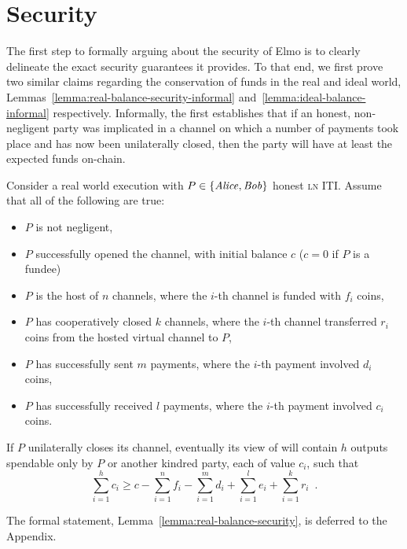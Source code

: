 \section{Security}
  \label{section:security}
  The first step to formally arguing about the security of Elmo is to
  clearly delineate the exact security guarantees it provides. To that end, we
  first prove two similar claims regarding the conservation of funds in the real
  and ideal world, Lemmas~\ref{lemma:real-balance-security-informal}
  and~\ref{lemma:ideal-balance-informal} respectively. Informally, the first
  establishes that if an honest, non-negligent party was implicated in a channel
  on which a number of payments took place and has now been unilaterally closed,
  then the party will have at least the expected funds on-chain.

\begin{lemma}
\label{lemma:real-balance-security-informal}
  Consider a real world execution with $P \in \{\mathit{Alice}, \mathit{Bob}\}$ honest
  \textsc{ln} ITI. Assume that all of the following are true:
  \begin{itemize}
    \item $P$ is not negligent,
    \item $P$ successfully opened the channel, with initial balance $c$ ($c = 0$
    if $P$ is a fundee)
    \item $P$ is the host of $n$ channels, where the $i$-th channel is funded
    with $f_i$ coins,
    \item $P$ has cooperatively closed $k$ channels, where the $i$-th channel
    transferred $r_i$ coins from the hosted virtual channel to $P$,
    \item $P$ has successfully sent $m$ payments, where the $i$-th payment
    involved $d_i$ coins,
    \item $P$ has successfully received $l$ payments, where the $i$-th payment
    involved $c_i$ coins.
  \end{itemize}
  If $P$ unilaterally closes its channel, eventually its view of \ledger will contain $h$
  outputs spendable only by $P$ or another kindred party, each of value $c_i$,
  such that
  \begin{equation}
    \sum\limits_{i=1}^h c_i \geq c - \sum\limits_{i=1}^n f_i -
    \sum\limits_{i=1}^m d_i + \sum\limits_{i=1}^l e_i + \sum\limits_{i=1}^k r_i
    \enspace.
  \end{equation}
\end{lemma}
The formal statement, Lemma~\ref{lemma:real-balance-security}, is deferred to
the Appendix.

